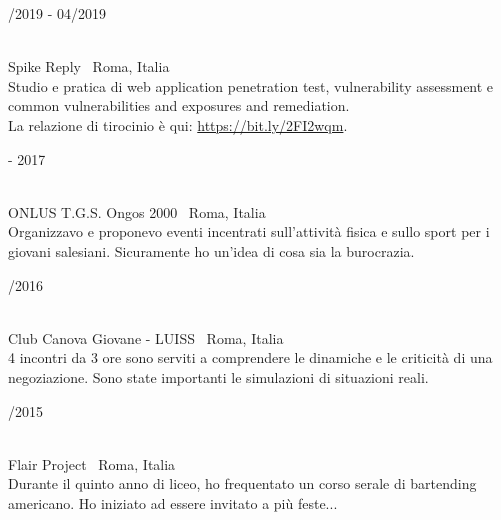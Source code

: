 \begin{minipage}{.3\textwidth}
	/2019 - 04/2019 \faCalendar
\end{minipage}
\hfill
\begin{minipage}{.65\textwidth}
	\vfill
	 \\
	\color{Maroon} Spike Reply \color{Sepia} \hfill \faMapMarker \ Roma, Italia
	\smallskip
	\\
	\color{gray} Studio e pratica di web application penetration test, vulnerability assessment e common vulnerabilities and exposures and remediation. \\ La relazione di tirocinio è qui: \url{https://bit.ly/2FI2wqm}.
	\vfill
\end{minipage}

\bigskip

\begin{minipage}{.3\textwidth}
	 - 2017 \faCalendar
\end{minipage}
\hfill
\begin{minipage}{.65\textwidth}
	\vfill
	 \\
	\color{Maroon} ONLUS T.G.S. Ongos 2000 \color{Sepia} \hfill \faMapMarker \ Roma, Italia
	\smallskip
	\\
	\color{gray} Organizzavo e proponevo eventi incentrati sull'attività fisica e sullo sport per i giovani salesiani. Sicuramente ho un'idea di cosa sia la burocrazia.
	\vfill
\end{minipage}

\bigskip

\begin{minipage}{.3\textwidth}
	/2016 \faCalendar
\end{minipage}
\hfill
\begin{minipage}{.65\textwidth}
	\vfill
	 \\
	\color{Maroon} Club Canova Giovane - LUISS \color{Sepia} \hfill \faMapMarker \ Roma, Italia
	\smallskip
	\\
	\color{gray} 4 incontri da 3 ore sono serviti a comprendere le dinamiche e le criticità di una negoziazione. Sono state importanti le simulazioni di situazioni reali.
	\vfill
\end{minipage}

\bigskip

\begin{minipage}{.3\textwidth}
	/2015 \faCalendar
\end{minipage}
\hfill
\begin{minipage}{.65\textwidth}
	\vfill
	 \\
	\color{Maroon} Flair Project \color{Sepia} \hfill \faMapMarker \ Roma, Italia
	\smallskip
	\\
	\color{gray} Durante il quinto anno di liceo, ho frequentato un corso serale di bartending americano. Ho iniziato ad essere invitato a più feste...
	\vfill
\end{minipage}

